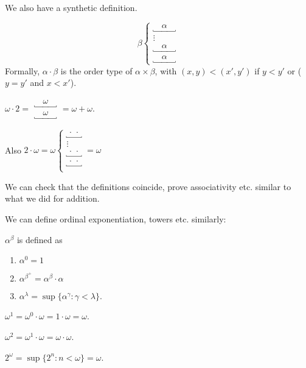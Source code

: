 \documentclass[a4paper]{article}
\begin{document}
We also have a synthetic definition.
\begin{defi}
  \[
    \beta\left\{
      \begin{array}{c}
        \underbracket{\quad\alpha\quad} \\
        \vdots \\
        \underbracket{\quad\alpha\quad} \\
        \underbracket{\quad\alpha\quad}
      \end{array}\right.
    \]
  Formally, $\alpha\cdot \beta$ is the order type of $\alpha\times \beta$, with $(x, y) < (x', y')$ if $y < y'$ or ($y = y'$ and $x < x'$).
\end{defi}

\begin{eg}
  $\displaystyle\omega\cdot 2 =
  \begin{array}{c}
    \underbracket{\quad\omega\quad}\\
    \underbracket{\quad\omega\quad}
  \end{array} = \omega + \omega$.

  Also $2\cdot \omega = \omega\left\{
  \begin{array}{c}
    \underbracket{\,\cdot\,\cdot\,} \\
    \vdots \\
    \underbracket{\,\cdot\,\cdot\,} \\
    \underbracket{\,\cdot\,\cdot\,} \\
  \end{array}\right. = \omega$
\end{eg}
We can check that the definitions coincide, prove associativity etc. similar to what we did for addition.

We can define ordinal exponentiation, towers etc. similarly:
\begin{defi}
  $\alpha^\beta$ is defined as
  \begin{enumerate}
    \item $\alpha^0 = 1$
    \item $\alpha^{\beta^+} = \alpha^\beta \cdot \alpha$
    \item $\alpha^{\lambda} = \sup \{\alpha^\gamma: \gamma< \lambda\}$.
  \end{enumerate}
\end{defi}

\begin{eg}
  $\omega^1 = \omega^0\cdot \omega = 1\cdot \omega = \omega$.

  $\omega^2 = \omega^1\cdot \omega = \omega\cdot \omega$.

  $2^{\omega} = \sup \{2^n: n < \omega\} = \omega$.
\end{eg}
\end{document}
